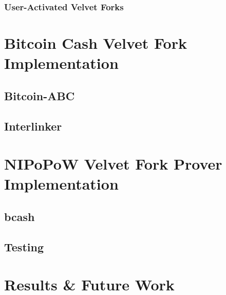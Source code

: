 \documentclass[11pt]{llncs}
\begin{document}
\subsubsection{User-Activated Velvet Forks}

\section{Bitcoin Cash Velvet Fork Implementation}

\subsection{Bitcoin-ABC}
\subsection{Interlinker}

\section{NIPoPoW Velvet Fork Prover Implementation}

\subsection{bcash}
\subsection{Testing}

\section{Results \& Future Work}


\end{document}
